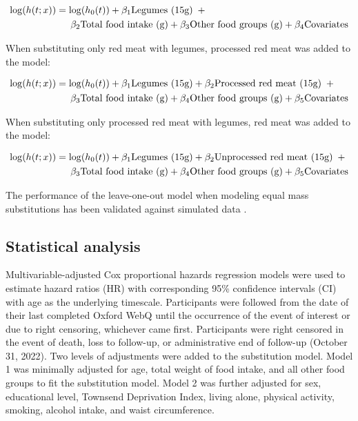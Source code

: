 \documentclass[nutrients,article,submit,moreauthors,pdftex]{Definitions/mdpi}
\begin{document}
\begin{align}
\log(h(t;x)) &= \log(h_0(t)) + \beta_1 \text{Legumes (15g)} \hspace{0.5em} + \nonumber \\
&\quad \hspace{0.5em} \beta_2 \text{Total food intake (g)} + \beta_3 \text{Other food groups (g)} + \beta_4 \text{Covariates}
\end{align}

\noindent When substituting only red meat with legumes, processed red
meat was added to the model:

\begin{align}
\log(h(t;x)) &= \log(h_0(t)) + \beta_1 \text{Legumes (15g)} + \beta_2 \text{Processed red meat (15g)} \hspace{0.5em} + \nonumber \\
&\quad \hspace{0.5em} \beta_3 \text{Total food intake (g)} + \beta_4 \text{Other food groups (g)} + \beta_5 \text{Covariates}
\end{align}

\noindent When substituting only processed red meat with legumes, red
meat was added to the model:

\begin{align}
\log(h(t;x)) &= \log(h_0(t)) + \beta_1 \text{Legumes (15g)} + \beta_2 \text{Unprocessed red meat (15g)} \hspace{0.5em} + \nonumber \\
&\quad \hspace{0.5em} \beta_3 \text{Total food intake (g)}  + \beta_4 \text{Other food groups (g)} + \beta_5 \text{Covariates}
\end{align}

\noindent The performance of the leave-one-out model when modeling equal
mass substitutions has been validated against simulated data
\citep{Tomova2022}.

\hypertarget{subsec6}{%
\subsection{Statistical analysis}\label{subsec6}}

Multivariable-adjusted Cox proportional hazards regression models were
used to estimate hazard ratios (HR) with corresponding 95\% confidence
intervals (CI) with age as the underlying timescale. Participants were
followed from the date of their last completed Oxford WebQ until the
occurrence of the event of interest or due to right censoring, whichever
came first. Participants were right censored in the event of death, loss
to follow-up, or administrative end of follow-up (October 31, 2022). Two
levels of adjustments were added to the substitution model. Model 1 was
minimally adjusted for age, total weight of food intake, and all other
food groups to fit the substitution model. Model 2 was further adjusted
for sex, educational level, Townsend Deprivation Index, living alone,
physical activity, smoking, alcohol intake, and waist circumference.
\end{document}
